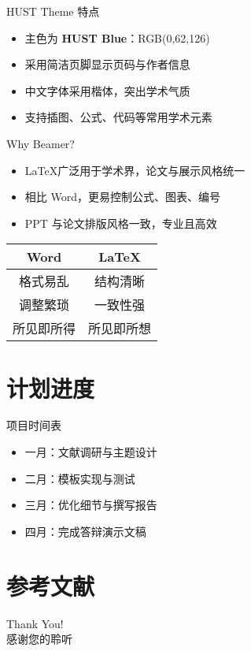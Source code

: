 \documentclass{beamer}
\begin{document}
\begin{frame}{HUST Theme 特点}
    \begin{itemize}
        \item 主色为 \textbf{HUST Blue}：RGB(0,62,126)
        \item 采用简洁页脚显示页码与作者信息
        \item 中文字体采用楷体，突出学术气质
        \item 支持插图、公式、代码等常用学术元素
    \end{itemize}
\end{frame}

\begin{frame}{Why Beamer?}
    \begin{itemize}
        \item \LaTeX 广泛用于学术界，论文与展示风格统一
        \item 相比 Word，更易控制公式、图表、编号
        \item PPT 与论文排版风格一致，专业且高效
    \end{itemize}
    \begin{table}[h]
        \centering
        \begin{tabular}{c|c}
            Word & \LaTeX \\
            \hline
            格式易乱 & 结构清晰 \\
            调整繁琐 & 一致性强 \\
            所见即所得 & 所见即所想 \\
        \end{tabular}
    \end{table}
\end{frame}

\section{计划进度}
\begin{frame}{项目时间表}
    \begin{itemize}
        \item 一月：文献调研与主题设计
        \item 二月：模板实现与测试
        \item 三月：优化细节与撰写报告
        \item 四月：完成答辩演示文稿
    \end{itemize}
\end{frame}

\section{参考文献}
\begin{frame}[allowframebreaks]
    
    
\end{frame}

\begin{frame}
    \begin{center}
        {\Huge\calligra Thank You!}\\[1em]
        \large 感谢您的聆听
    \end{center}
\end{frame}
\end{document}
